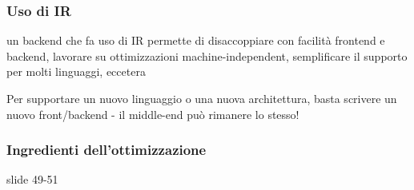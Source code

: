 \subsubsection{Uso di IR}

un backend che fa uso di IR permette di disaccoppiare con facilit\`a frontend e backend, lavorare su ottimizzazioni machine-independent, semplificare il supporto per molti linguaggi, eccetera

\begin{emphasize}
  Per supportare un nuovo linguaggio o una nuova architettura, basta scrivere un nuovo front/backend - il middle-end pu\`o rimanere lo stesso!
\end{emphasize}

\subsubsection{Ingredienti dell'ottimizzazione}

slide 49-51


